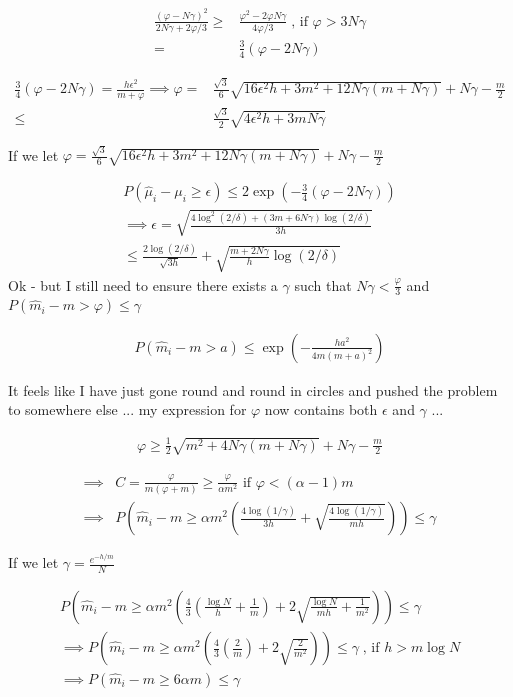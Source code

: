 \documentclass{article}
\newcommand{\eqn}[1]{\begin{align}#1\end{align}}
\theoremstyle{plain}
\theoremstyle{definition}
\begin{document}
\eqn{
\frac{(\varphi-N\gamma)^2}{2N\gamma + 2\varphi/3}  \geq & \frac{\varphi^2-2\varphi N\gamma}{4\varphi/3} \; \text{, if } \varphi > 3N\gamma \\
= & \frac{3}{4}(\varphi - 2N\gamma)
}

\eqn{
\frac{3}{4}(\varphi - 2N\gamma) = \frac{h\epsilon^2}{m+\varphi} \implies \varphi = &\frac{\sqrt{3}}{6}\sqrt{16\epsilon^2 h+3m^2+12N\gamma(m+N\gamma)} + N\gamma - \frac{m}{2}\\
\leq & \frac{\sqrt{3}}{2}\sqrt{4\epsilon^2 h+3mN\gamma}
}

If we let $\varphi =\frac{\sqrt{3}}{6}\sqrt{16\epsilon^2 h+3m^2+12N\gamma(m+N\gamma)} + N\gamma - \frac{m}{2} $

\eqn{
P(\hat{\mu}_i-\mu_i \geq \epsilon) \leq 2\exp(-\frac{3}{4}(\varphi - 2N\gamma))\\
\implies \epsilon = \sqrt{\frac{4\log^2(2/\delta)+(3m+6N\gamma)\log(2/\delta)}{3h}}\\
\leq \frac{2\log(2/\delta)}{\sqrt{3h}}+\sqrt{\frac{m+2N\gamma}{h}\log(2/\delta)}
}
Ok - but I still need to ensure there exists a $\gamma$ such that  $N\gamma < \frac{\varphi}{3}$ and $P(\hat{m}_i - m > \varphi) \leq \gamma$

\eqn{
P(\hat{m}_i - m > a) \leq \exp(-\frac{h a^2}{4m(m+a)^2})
}


It feels like I have just gone round and round in circles and pushed the problem to somewhere else ... my expression for $\varphi$ now contains both $\epsilon$ and $\gamma$ ...

\eqn{
\varphi \geq \frac{1}{2}\sqrt{m^2+4N\gamma(m+N\gamma)} + N\gamma - \frac{m}{2}
}










\pagebreak

\eqn{
 \implies & C = \frac{\varphi}{m(\varphi+m)}  \geq \frac{\varphi}{\alpha m^2} \text{ if } \varphi < (\alpha-1)m\\
\implies & P\left(\hat{m}_i - m \geq \alpha m^2 \left( \frac{4\log(1/\gamma)}{3h}+\sqrt{\frac{4\log(1/\gamma)}{mh}} \right)\right) \leq \gamma
}

If we let $\gamma = \frac{e^{-h/m}}{N}$

\eqn{
P\left(\hat{m}_i - m \geq \alpha m^2 \left( \frac{4}{3}(\frac{\log N}{h}+\frac{1}{m})+2\sqrt{\frac{\log N}{mh}+\frac{1}{m^2}} \right)\right) \leq \gamma \\
\implies P\left(\hat{m}_i - m \geq \alpha m^2 \left( \frac{4}{3}(\frac{2}{m})+2\sqrt{\frac{2}{m^2}} \right)\right) \leq \gamma \; \text{, if } h > m\log N \\
\implies P\left(\hat{m}_i - m \geq 6\alpha m \right) \leq \gamma
}
\end{document}
